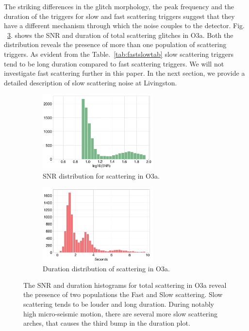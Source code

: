 \documentclass[12pt]{iopart}
\begin{document}
The striking differences in the glitch morphology, the peak frequency and the duration of the triggers for slow and fast scattering triggers suggest that they have a different mechanism through which the noise couples to the detector. Fig. ~\ref{fig:snrdur}. shows the SNR and duration of total scattering glitches in O3a. Both the distribution reveals the presence of more than one population of scattering triggers. As evident from the Table.~\ref{tab:fastslowtab} slow scattering triggers tend to be long duration compared to fast scattering triggers. We will not investigate fast scattering further in this paper. In the next section, we provide a detailed description of slow scattering noise at Livingston.
\begin{figure}[h]
\captionsetup[subfigure]{font=scriptsize,labelfont=scriptsize}
   \centering
    \begin{subfigure}[b]{0.45\textwidth}
        \centering
         \includegraphics[width= 6cm]{histsnr4b.png}
         \caption{SNR distribution for scattering in O3a.}
         \label{fig:histsnr}
    \end{subfigure}
    \hfill
    \begin{subfigure}[b]{0.5\textwidth}
        \centering
         \includegraphics[width =6cm]{histdur4b.png}
         \caption{ Duration distribution of scattering in O3a.}
         \label{fig:histdur}
         
    
    \end{subfigure}
    \caption{The SNR and duration histograms for total scattering in O3a reveal the presence of two populations the Fast and Slow scattering. Slow scattering tends to be louder and long duration. During notably high micro-seismic motion, there are several more slow scattering arches, that causes the third bump in the duration plot.}
    \label{fig:snrdur}
    
\end{figure}
\end{document}
